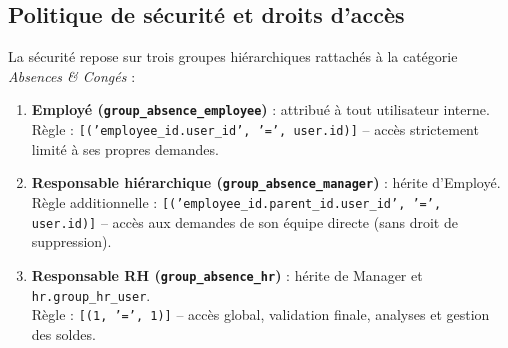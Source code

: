 \documentclass[11pt,a4paper]{article}
\begin{document}
\subsection{Politique de sécurité et droits d'accès}
La sécurité repose sur trois groupes hiérarchiques rattachés à la catégorie \textit{Absences \& Congés} :
\begin{enumerate}[itemsep=2pt]
    \item \textbf{Employé (\texttt{group\_absence\_employee})} : attribué à tout utilisateur interne.\\
    Règle : \texttt{[('employee\_id.user\_id', '=', user.id)]} -- accès strictement limité à ses propres demandes.
    \item \textbf{Responsable hiérarchique (\texttt{group\_absence\_manager})} : hérite d'Employé.\\
    Règle additionnelle : \texttt{[('employee\_id.parent\_id.user\_id', '=', user.id)]} -- accès aux demandes de son équipe directe (sans droit de suppression).
    \item \textbf{Responsable RH (\texttt{group\_absence\_hr})} : hérite de Manager et \texttt{hr.group\_hr\_user}.\\
    Règle : \texttt{[(1, '=', 1)]} -- accès global, validation finale, analyses et gestion des soldes.
\end{enumerate}
\end{document}
